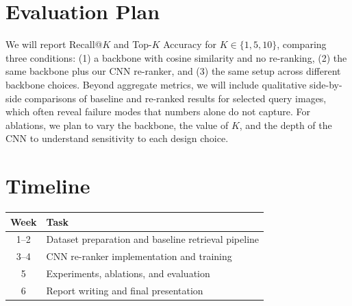 \documentclass[12pt]{article}
\begin{document}
\section{Evaluation Plan}

We will report Recall@$K$ and Top-$K$ Accuracy for $K \in \{1, 5, 10\}$, comparing three conditions: (1) a backbone with cosine similarity and no re-ranking, (2) the same backbone plus our CNN re-ranker, and (3) the same setup across different backbone choices. Beyond aggregate metrics, we will include qualitative side-by-side comparisons of baseline and re-ranked results for selected query images, which often reveal failure modes that numbers alone do not capture. For ablations, we plan to vary the backbone, the value of $K$, and the depth of the CNN to understand sensitivity to each design choice.

\section{Timeline}

\begin{tabular}{cl}
\toprule
\textbf{Week} & \textbf{Task} \\
\midrule
1--2 & Dataset preparation and baseline retrieval pipeline \\
3--4 & CNN re-ranker implementation and training \\
5    & Experiments, ablations, and evaluation \\
6    & Report writing and final presentation \\
\bottomrule
\end{tabular}
\end{document}
